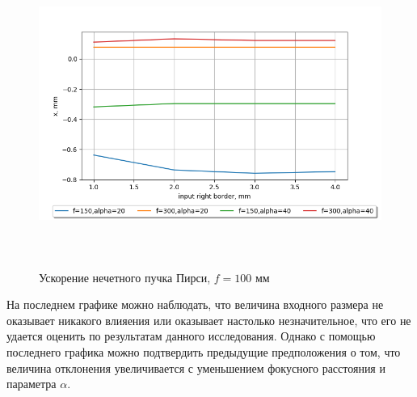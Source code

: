 {     \begin{figure}[H]
        \centering
        \includegraphics[height = 10cm]{plots/!graphics_acc_input.png}
        \caption{Ускорение нечетного пучка Пирси, $f = 100$ мм}
        \label{acc_input}
    \end{figure}
      \vspace{0.5cm}
    На последнем графике можно наблюдать, что величина входного размера не оказывает никакого влияения или оказывает настолько незначительное,
    что его не удается оценить по результатам данного исследования. Однако с помощью последнего графика можно подтвердить предыдущие предположения о том, что величина отклонения
    увеличивается с уменьшением фокусного расстояния и параметра $\alpha$.

}
